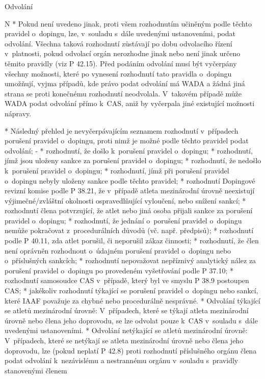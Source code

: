 \secc Odvolání

\begitems \style N
* Pokud není uvedeno jinak, proti všem rozhodnutím učiněným podle těchto pravidel o~dopingu, lze, v~souladu s~dále uvedenými ustanoveními, podat odvolání. Všechna taková rozhodnutí zůstávají po dobu odvolacího řízení v~platnosti, pokud odvolací orgán nerozhodne jinak nebo není jinak určeno těmito pravidly (viz P 42.15).  Před podáním odvolání musí být vyčerpány všechny možnosti, které po vynesení rozhodnutí tato pravidla o~dopingu umožňují, vyjma případů, kde právo podat odvolání má WADA a žádná jiná strana se proti konečnému rozhodnutí neodvolala. V~takovém případě může WADA podat odvolání přímo k~CAS, aniž by vyčerpala jiné existující možnosti nápravy.

* Následný přehled je nevyčerpávajícím seznamem rozhodnutí v~případech porušení pravidel o~dopingu, proti nimž je možné podle těchto pravidel podat odvolání;
  \begitems \style -
  * rozhodnutí, že došlo k~porušení pravidel o~dopingu;
  * rozhodnutí, jímž jsou uloženy sankce za porušení pravidel o~dopingu;
  * rozhodnutí, že nedošlo k~porušení pravidel o~dopingu;
  * rozhodnutí, jímž při porušení pravidel o~dopingu nebyly uloženy sankce podle těchto pravidel;
  * rozhodnutí Dopingové revizní komise podle P 38.21, že v~případě atleta mezinárodní úrovně neexistují výjimečné/zvláštní okolnosti ospravedlňující vyloučení, nebo snížení sankcí;
  * rozhodnutí člena potvrzující, že atlet nebo jiná osoba přijali sankce za porušení pravidel o~dopingu;
  * rozhodnutí, že jednání o~porušení pravidel o~dopingu nemůže pokračovat z~procedurálních důvodů (vč. např. předpisů);
  * rozhodnutí podle P 40.11, zda atlet porušil, či neporušil zákaz činnosti;
  * rozhodnutí, že člen není oprávněn rozhodnout o~údajném porušení pravidel o~dopingu nebo o~příslušných sankcích;
  * rozhodnutí nepovažovat nepříznivý analytický nález za porušení pravidel o~dopingu po provedeném vyšetřování podle P 37.10;
  * rozhodnutí samosoudce CAS v~případě, který byl ve smyslu P 38.9 postoupen CAS;
  * jakékoliv rozhodnutí týkající se porušení pravidel o~dopingu nebo sankcí, které IAAF považuje za chybné nebo procedurálně nesprávné.
  \enditems
* Odvolání týkající se atletů mezinárodní úrovně: V~případech, které se týkají atleta mezinárodní úrovně nebo člena jeho doprovodu, se lze odvolat pouze k~CAS v~souladu s~dále uvedenými ustanoveními.
* Odvolání netýkající se atletů mezinárodní úrovně: V~případech, které se netýkají se atleta mezinárodní úrovně nebo člena jeho doprovodu, lze (pokud neplatí P 42.8) proti rozhodnutí příslušného orgánu člena podat odvolání k~nezávislému a nestrannému orgánu v~souladu s~pravidly stanovenými členem

